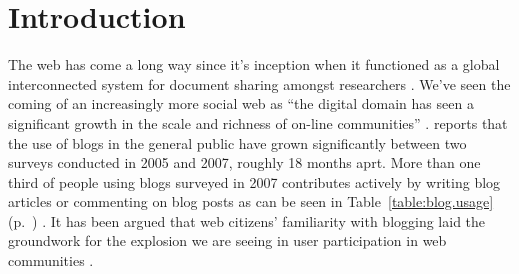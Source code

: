 \chapter{Introduction}

%
%

The web has come a long way since it's inception when it functioned as a
global interconnected system for document sharing amongst researchers
\citep[p.~82]{bernerslee92}. We've
seen the coming of an increasingly more social web as
``the digital domain has seen a significant growth in the scale and richness
of on-line communities'' \citep[p.~44]{backstrom06}.
\citet[ch.~1, p.~2]{rosa07} reports that the
use of blogs in the general public%
have grown significantly between two surveys conducted in 2005 and 2007,
roughly 18 months aprt.
More than one third of people using blogs surveyed in 2007 contributes
actively by writing blog articles or commenting on blog posts as can be seen in
Table~\ref{table:blog.usage}
(p.~\pageref{table:blog.usage})
\citep[ch.~1, p.~6]{rosa07}.
It has been argued that web citizens'
familiarity with blogging laid the groundwork for the explosion we are seeing
in user participation in web communities \citep{weiss05,beer07}.


